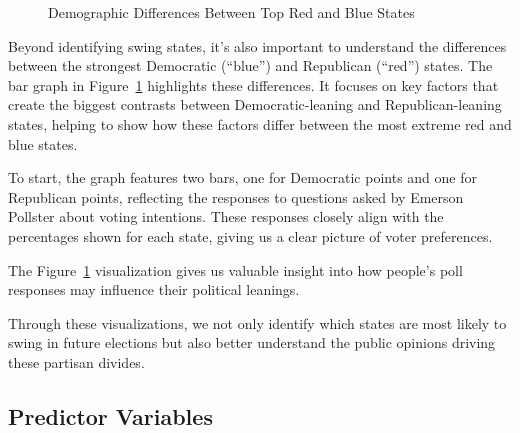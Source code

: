 \documentclass[
  letterpaper,
  DIV=11,
  numbers=noendperiod]{scrartcl}
\begin{document}
\begin{figure}


\caption{\label{fig-party-extremes}Demographic Differences Between Top
Red and Blue States}

\end{figure}%

Beyond identifying swing states, it's also important to understand the
differences between the strongest Democratic (``blue'') and Republican
(``red'') states. The bar graph in Figure~\ref{fig-party-extremes}
highlights these differences. It focuses on key factors that create the
biggest contrasts between Democratic-leaning and Republican-leaning
states, helping to show how these factors differ between the most
extreme red and blue states.

To start, the graph features two bars, one for Democratic points and one
for Republican points, reflecting the responses to questions asked by
Emerson Pollster about voting intentions. These responses closely align
with the percentages shown for each state, giving us a clear picture of
voter preferences.

The Figure~\ref{fig-party-extremes} visualization gives us valuable
insight into how people's poll responses may influence their political
leanings.

Through these visualizations, we not only identify which states are most
likely to swing in future elections but also better understand the
public opinions driving these partisan divides.

\subsection{Predictor Variables}\label{predictor-variables}
\end{document}
